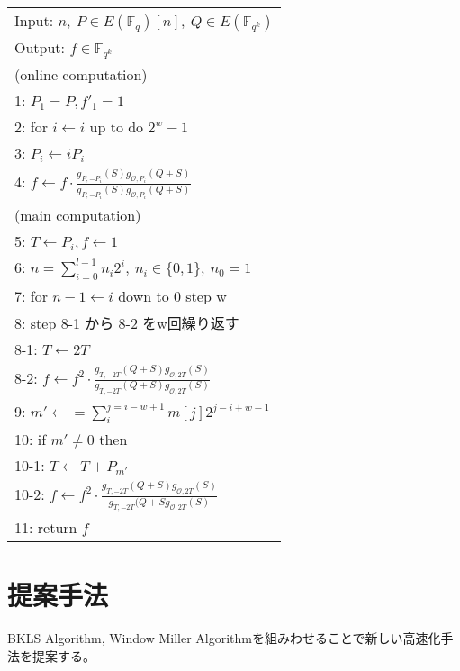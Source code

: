 \documentclass[twocolumn]{jsarticle} %
\begin{document}
\begin{longtable}
 \begin{center}
  \begin{tabular}{|l|}
     \hline
Input: $n, \ P \in E(\mathbb{F}_q)[n], \ Q \in E(\mathbb{F}_{q^k})$ \\
Output: $f \in \mathbb{F}_{q^k}$  \\
     \hline
(online computation) \\
1: \quad $P_1 = P, f'_1=1 $\\
2: \quad for $i \gets i$ up to do $2^w -1$\\
3: \quad \quad $P_i \gets iP_i $\\
4: \quad \quad $f \gets f \cdot \frac{g_{P,-P_i}(S)g_{\mathcal{O},P_i}(Q+S)}{g_{P,-P_i}(S)g_{\mathcal{O},P_i}(Q+S)}$ \\
(main computation) \\
5: \quad $T \gets P_i, f \gets 1 $\\
6: \quad $n=\sum^{l - 1}_{i=0} n_i 2^i, \ n_i \in \{0,1\},\ n_0 = 1$\\
7: \quad for $ n-1 \gets i$ down to 0 step w\\
8: \quad step 8-1 から 8-2 をw回繰り返す\\
8-1: \quad \quad $T \gets 2T $\\
8-2: \quad \quad $f \gets f^2 \cdot \frac{g_{T,-2T}(Q+S)g_{\mathcal{O},2T}(S)}{g_{T,-2T}(Q+S)g_{\mathcal{O},2T}(S)}$\\
9: \quad $m' \gets =\sum^{j=i-w+1}_{i} m[j]2^{j-i+w-1} $\\
10: \quad if $m' \neq 0$ then\\
10-1: \quad \quad $T \gets T + P_{m'} $\\
10-2: \quad \quad $f \gets f^2 \cdot \frac{g_{T,-2T}(Q+S)g_{\mathcal{O},2T}(S)}{g_{T,-2T}(Q+Sg_{\mathcal{O},2T}(S)}$ \\
11: \quad return $f$\\
     \hline
   \end{tabular}
 \end{center}
\end{longtable}

\section{提案手法}
BKLS Algorithm, Window Miller Algorithmを組みわせることで新しい高速化手法を提案する。
\end{document}

